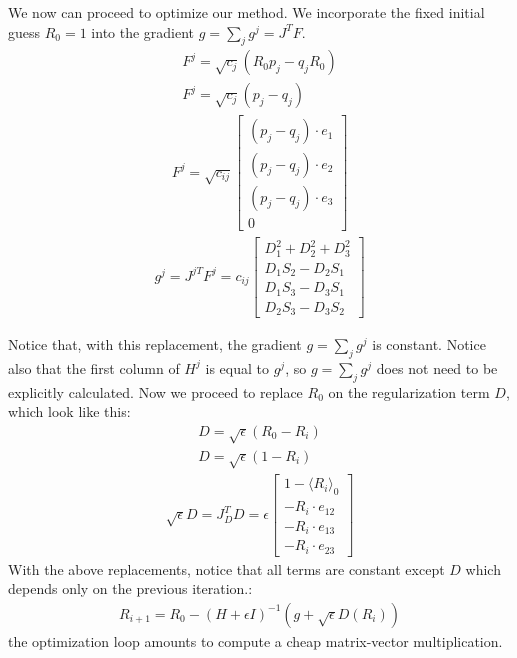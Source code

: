 \documentclass{birkjour}
\numberwithin{equation}{section}
\begin{document}
We now can proceed to optimize our method. We incorporate the fixed initial guess $R_0 = 1$ into the gradient $g = \sum_j{g^j} = J^T F$.
\begin{eqnarray*}
F^j = \sqrt{c_j} (R_0 p_j - q_j R_0)\\
F^j = \sqrt{c_j} (p_j - q_j)
\end{eqnarray*}
\begin{eqnarray*}
F^j = \sqrt{c_{ij}} 
\left[\begin{array}{c}(p_j - q_j) \cdot e_1 \\ (p_j - q_j) \cdot e_2 \\ (p_j - q_j) \cdot e_3 \\ 0\end{array}\right]
\end{eqnarray*}
\begin{eqnarray*}
g^j = J^{jT} F^j = c_{ij}
\left[\begin{array}{c} D_1^2 + D_2^2 + D_3^2 \\ D_1 S_2 - D_2 S_1 \\ D_1 S_3 - D_3 S_1 \\ D_2 S_3 - D_3 S_2\end{array}\right]
\end{eqnarray*}

Notice that, with this replacement, the gradient $g = \sum_j{g^j}$ is constant. Notice also that the first column of $H^j$ is equal to $g^j$, 
so $g = \sum_j{g^j}$ does not need to be explicitly calculated. 
Now we proceed to replace $R_0$ on the regularization term $D$, which look like this:
\begin{eqnarray*}
D = \sqrt{\epsilon} (R_0 - R_i)\\
D = \sqrt{\epsilon} (1 - R_i)
\end{eqnarray*}
\begin{eqnarray*}
\sqrt{\epsilon} D = J_D^T D = \epsilon 
\left[\begin{array}{c} 1-\langle R_i \rangle_0 \\ -R_i \cdot e_{12} \\ -R_i \cdot e_{13} \\ -R_i \cdot e_{23}\end{array}\right]
\end{eqnarray*}
With the above replacements, notice that all terms are constant except $D$ which depends only on the previous iteration.:
\begin{eqnarray*}
R_{i+1} = R_0 - (H + \epsilon I)^{-1} (g + \sqrt{\epsilon} D(R_i))
\end{eqnarray*}
the optimization loop amounts to compute a cheap matrix-vector multiplication.
\end{document}
